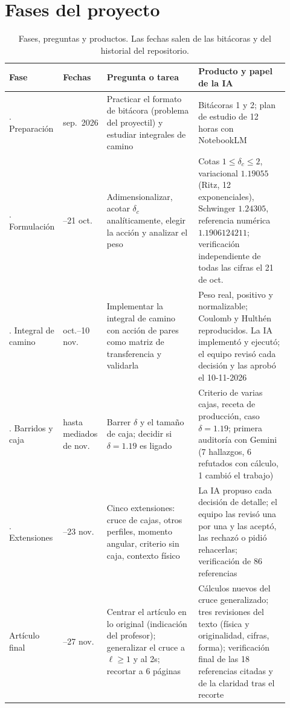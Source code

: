 \documentclass[10pt,letterpaper]{article}
\begin{document}
\section{Fases del proyecto}

\begin{table}[h]
\centering\small
\caption{Fases, preguntas y productos. Las fechas salen de las bitácoras y del historial del repositorio.}
\begin{tabular}{@{}>{\raggedright\arraybackslash}p{0.13\linewidth}>{\raggedright\arraybackslash}p{0.13\linewidth}>{\raggedright\arraybackslash}p{0.33\linewidth}>{\raggedright\arraybackslash}p{0.33\linewidth}@{}}
\toprule
Fase & Fechas & Pregunta o tarea & Producto y papel de la IA\\
\midrule
0. Preparación & sep.\ 2026 & Practicar el formato de bitácora (problema del proyectil) y estudiar integrales de camino & Bitácoras 1 y 2; plan de estudio de 12 horas con NotebookLM\\
\addlinespace
1. Formulación & 12--21 oct. & Adimensionalizar, acotar $\delta_c$ analíticamente, elegir la acción y analizar el peso & Cotas $1\le\delta_c\le2$, variacional $1.19055$ (Ritz, 12 exponenciales), Schwinger $1.24305$, referencia numérica $1.1906124211$; verificación independiente de todas las cifras el 21 de oct.\\
\addlinespace
2. Integral de camino & 21 oct.--10 nov. & Implementar la integral de camino con acción de pares como matriz de transferencia y validarla & Peso real, positivo y normalizable; Coulomb y Hulthén reproducidos. La IA implementó y ejecutó; el equipo revisó cada decisión y las aprobó el 10-11-2026\\
\addlinespace
3. Barridos y caja & hasta mediados de nov. & Barrer $\delta$ y el tamaño de caja; decidir si $\delta=1.19$ es ligado & Criterio de varias cajas, receta de producción, caso $\delta=1.19$; primera auditoría con Gemini (7 hallazgos, 6 refutados con cálculo, 1 cambió el trabajo)\\
\addlinespace
4. Extensiones & 15--23 nov. & Cinco extensiones: cruce de cajas, otros perfiles, momento angular, criterio sin caja, contexto físico & La IA propuso cada decisión de detalle; el equipo las revisó una por una y las aceptó, las rechazó o pidió rehacerlas; verificación de 86 referencias\\
\addlinespace
Artículo final & 23--27 nov. & Centrar el artículo en lo original (indicación del profesor); generalizar el cruce a $\ell\ge1$ y al 2s; recortar a 6 páginas & Cálculos nuevos del cruce generalizado; tres revisiones del texto (física y originalidad, cifras, forma); verificación final de las 18 referencias citadas y de la claridad tras el recorte\\
\bottomrule
\end{tabular}
\end{table}
\end{document}

